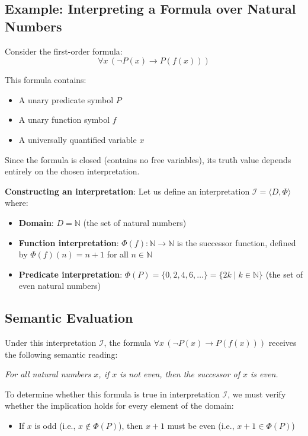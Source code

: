 \documentclass[11pt,a4paper]{article}
\theoremstyle{definition}
\theoremstyle{plain}
\theoremstyle{remark}
\newcommand{\N}{\mathbb{N}}
\begin{document}
\subsection{Example: Interpreting a Formula over Natural Numbers}

Consider the first-order formula:
\[
\forall x \, (\neg P(x) \rightarrow P(f(x)))
\]

This formula contains:
\begin{itemize}
    \item A unary predicate symbol $P$
    \item A unary function symbol $f$
    \item A universally quantified variable $x$
\end{itemize}

Since the formula is closed (contains no free variables), its truth value depends entirely on the chosen interpretation.

\textbf{Constructing an interpretation}: Let us define an interpretation $\mathcal{I} = \langle D, \Phi \rangle$ where:
\begin{itemize}
    \item \textbf{Domain}: $D = \N$ (the set of natural numbers)
    \item \textbf{Function interpretation}: $\Phi(f) : \N \rightarrow \N$ is the successor function, defined by $\Phi(f)(n) = n + 1$ for all $n \in \N$
    \item \textbf{Predicate interpretation}: $\Phi(P) = \{0, 2, 4, 6, \dots\} = \{2k \mid k \in \N\}$ (the set of even natural numbers)
\end{itemize}

\subsection{Semantic Evaluation}

Under this interpretation $\mathcal{I}$, the formula $\forall x \, (\neg P(x) \rightarrow P(f(x)))$ receives the following semantic reading:

\textit{For all natural numbers $x$, if $x$ is not even, then the successor of $x$ is even.}

To determine whether this formula is true in interpretation $\mathcal{I}$, we must verify whether the implication holds for every element of the domain:
\begin{itemize}
    \item If $x$ is odd (i.e., $x \notin \Phi(P)$), then $x + 1$ must be even (i.e., $x + 1 \in \Phi(P)$)
\end{itemize}
\end{document}

